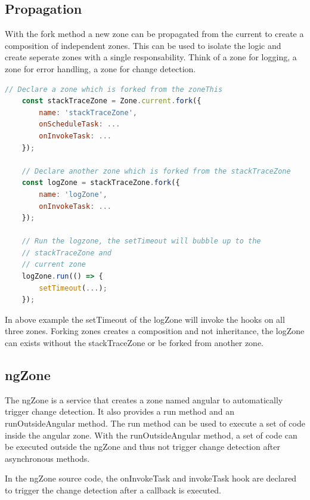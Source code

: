 \subsection{Propagation}
With the fork method a new zone can be propagated from the current to create a composition of independent zones. This can be used to isolate the logic and create seperate zones with a single responsability. Think of a zone for logging, a zone for error handling, a zone for change detection.
\autocite{AngularAir2019}
\begin{lstlisting}[language=Javascript]
	// Declare a zone which is forked from the zoneThis
	const stackTraceZone = Zone.current.fork({
		name: 'stackTraceZone',
		onScheduleTask: ...
		onInvokeTask: ...
	});

	// Declare another zone which is forked from the stackTraceZone
	const logZone = stackTraceZone.fork({
		name: 'logZone',
		onInvokeTask: ...
	});
	
	// Run the logzone, the setTimeout will bubble up to the 
	// stackTraceZone and
	// current zone
	logZone.run(() => {
		setTimeout(...);
	});
\end{lstlisting}
\autocite{AngularAir2019}
In above example the setTimeout of the logZone will invoke the hooks on all three zones. Forking zones creates a composition and not inheritance, the logZone can exists without the stackTraceZone or be forked from another zone.

\subsection{ngZone}
The ngZone is a service that creates a zone named angular to automatically trigger change detection. It also provides a run method and an runOutsideAngular method. The run method can be used to execute a set of code inside the angular zone. With the runOutsideAngular method, a set of code can be executed outside the ngZone and thus not trigger change detection after asynchronous methods.
\autocite{Sargsyan2020}

In the ngZone source code, the onInvokeTask and invokeTask hook are declared to trigger the change detection after a callback is executed.

